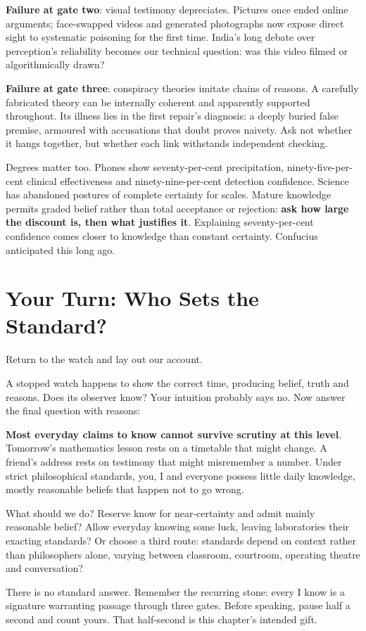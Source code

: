 \textbf{Failure at gate two}: visual testimony depreciates. Pictures once ended online arguments; face-swapped videos and generated photographs now expose direct sight to systematic poisoning for the first time. India's long debate over perception's reliability becomes our technical question: was this video filmed or algorithmically drawn?

\textbf{Failure at gate three}: conspiracy theories imitate chains of reasons. A carefully fabricated theory can be internally coherent and apparently supported throughout. Its illness lies in the first repair's diagnosis: a deeply buried false premise, armoured with accusations that doubt proves naivety. Ask not whether it hangs together, but whether each link withstands independent checking.

Degrees matter too. Phones show seventy-per-cent precipitation, ninety-five-per-cent clinical effectiveness and ninety-nine-per-cent detection confidence. Science has abandoned postures of complete certainty for scales. Mature knowledge permits graded belief rather than total acceptance or rejection: \textbf{ask how large the discount is, then what justifies it}. Explaining seventy-per-cent confidence comes closer to knowledge than constant certainty. Confucius anticipated this long ago.

\section{Your Turn: Who Sets the Standard?}
Return to the watch and lay out our account.

A stopped watch happens to show the correct time, producing belief, truth and reasons. Does its observer know? Your intuition probably says no. Now answer the final question with reasons:

\textbf{Most everyday claims to know cannot survive scrutiny at this level}. Tomorrow's mathematics lesson rests on a timetable that might change. A friend's address rests on testimony that might misremember a number. Under strict philosophical standards, you, I and everyone possess little daily knowledge, mostly reasonable beliefs that happen not to go wrong.

What should we do? Reserve know for near-certainty and admit mainly reasonable belief? Allow everyday knowing some luck, leaving laboratories their exacting standards? Or choose a third route: standards depend on context rather than philosophers alone, varying between classroom, courtroom, operating theatre and conversation?

There is no standard answer. Remember the recurring stone: every I know is a signature warranting passage through three gates. Before speaking, pause half a second and count yours. That half-second is this chapter's intended gift.
